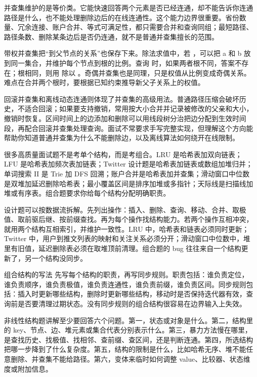 
并查集维护的是等价类。它能快速回答两个元素是否已经连通，却不能告诉你连通路径是什么，也不能处理删除边后的在线连通性。这个能力边界很重要。省份数量、冗余连接、账户合并、等式可满足性，都只需要合并和查询同组；最短路径、路径条数、删除某条边后是否仍连通，就不是普通并查集擅长的范围。

带权并查集把“到父节点的关系”也保存下来。除法求值中，若 ，可以把 a 和 b 放到同一集合，并维护每个节点到根的比例。查询  时，如果两者根不同，答案不存在；根相同，则用  除以 。奇偶并查集也是同理，只是权值从比例变成奇偶关系。难点在合并两个根时，要根据已知约束推导新父子关系上的权值。

回滚并查集和离线动态连通则体现了并查集的高级用法。普通路径压缩会破坏历史，不适合回滚；如果要支持撤销，常用按大小合并并记录被修改的父亲和大小，撤销时恢复。区间时间上的边添加和删除可以用线段树分治把边分配到生效时间段，再配合回滚并查集处理查询。面试不常要求手写完整实现，但理解这个方向能帮助你知道普通并查集为什么不能删除边，以及离线算法如何绕开在线限制。


很多高质量面试题不是考单个结构，而是考组合。LRU 是哈希表加双向链表；LFU 是哈希表加频次表加链表；Twitter 设计题是哈希表加链表或数组加堆归并；单词搜索 II 是 Trie 加 DFS 回溯；账户合并是哈希表加并查集；滑动窗口中位数是双堆加延迟删除哈希表；最小覆盖区间是排序加堆或多指针；天际线是扫描线加堆或有序表。组合题要求你给每个结构分配明确职责。

设计题可以按数据流拆解。先列出操作：插入、删除、查询、移动、合并、取极值、取前驱后继、按前缀查找。再为每个操作找结构能力。若两个操作互相冲突，就用两个结构互相索引，并维护一致性。LRU 中，哈希表和链表必须同时更新；Twitter 中，用户到推文列表的映射和关注关系必须分开；滑动窗口中位数中，堆里有旧值，延迟删除表必须在取堆顶前清理。组合题的 bug 往往来自一个结构更新了，另一个结构没同步。

\begin{principlebox}{组合结构的写法}
先写每个结构的职责，再写同步规则。职责包括：谁负责定位，谁负责顺序，谁负责极值，谁负责连通性，谁负责前缀，谁负责区间。同步规则包括：插入时更新哪些结构，删除时更新哪些结构，移动时是否保持迭代器有效，查询前是否要清理过期状态。没有同步规则的组合结构很容易在边界输入上失效。
\end{principlebox}


非线性结构题讲解至少要回答六个问题。第一，状态或对象是什么。第二，结构里的 key、节点、边、堆元素或集合代表分别表示什么。第三，暴力方法慢在哪里，是查找历史、找极值、找相邻、查前缀、查区间，还是判断连通。第四，所选结构把哪一步降到了什么复杂度。第五，结构的限制是什么，比如哈希无序、堆不能任意删除、并查集不能给路径。第六，变体来临时如何调整 value、比较器、状态维度或附加信息。


